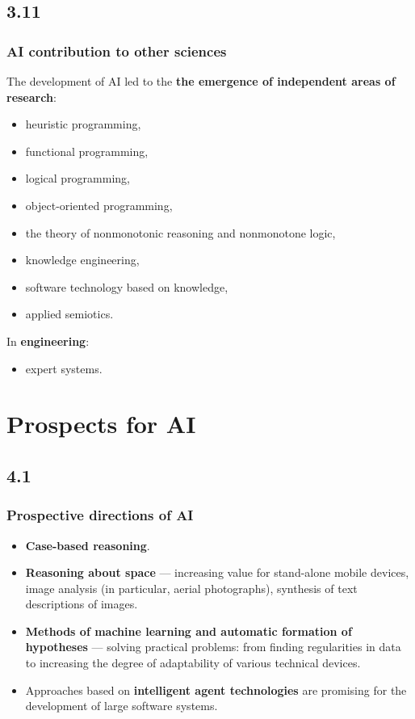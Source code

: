 \documentclass[default]{beamer}
\begin{document}
	\subsection{3.11}
	\begin{frame}
		\frametitle{AI contribution to other sciences}
		
		The development of AI led to the \textbf {the emergence of independent areas of research}:
		\begin{itemize}
			\item heuristic programming,
			\item functional programming,
			\item logical programming,
			\item object-oriented programming,
			\item the theory of nonmonotonic reasoning and nonmonotone logic,
			\item knowledge engineering,
			\item software technology based on knowledge,
			\item applied semiotics.
		\end{itemize}
		
		In \textbf{engineering}:
		\begin{itemize}
			\item expert systems.
		\end{itemize}
	\end{frame}

	\section{Prospects for AI}
	\subsection{4.1}
	\begin{frame}
		\frametitle{Prospective directions of AI}
		
		\begin{itemize}
			\item \textbf {Case-based reasoning}.
			\item \textbf {Reasoning about space} --- increasing value for stand-alone mobile devices, image analysis (in particular, aerial photographs), synthesis of text descriptions of images.
			\item \textbf {Methods of machine learning and automatic formation of hypotheses} --- solving practical problems: from finding regularities in data to increasing the degree of adaptability of various technical devices.
			\item Approaches based on \textbf {intelligent agent technologies} are promising for the development of large software systems.
			
		\end{itemize}
		
	\end{frame}
\end{document}

